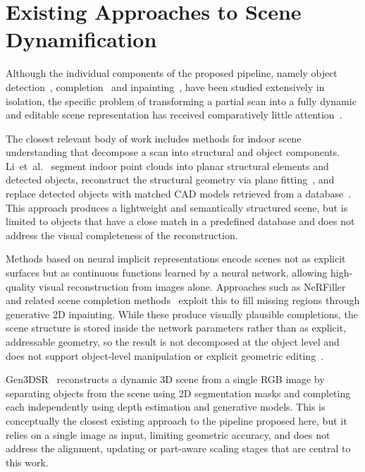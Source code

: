 \section{Existing Approaches to Scene Dynamification}
\label{sec:bg_sota_dynamification}

Although the individual components of the proposed pipeline, namely object detection~\cite{qi_deep_2019, xu_back_2022, cheng_aic3dod_nodate}, completion~\cite{mittal_autosdf_2022, chibane_implicit_2020, ren_xcube_2023, team_sam_2025} and inpainting~\cite{suvorov_resolution-robust_2022, vermandere_semantic_2024}, have been studied extensively in isolation, the specific problem of transforming a partial scan into a fully dynamic and editable scene representation has received comparatively little attention~\cite{ardelean_gen3dsr_2025}.

The closest relevant body of work includes methods for indoor scene understanding that decompose a scan into structural and object components. Li~et~al.~\cite{li_hybrid_2024} segment indoor point clouds into planar structural elements and detected objects, reconstruct the structural geometry via plane fitting~\cite{korman_latent_2018}, and replace detected objects with matched CAD models retrieved from a database~\cite{siddiqui_retrievalfuse_2021}. This approach produces a lightweight and semantically structured scene, but is limited to objects that have a close match in a predefined database and does not address the visual completeness of the reconstruction.

Methods based on neural implicit representations encode scenes not as explicit surfaces but as continuous functions learned by a neural network, allowing high-quality visual reconstruction from images alone. Approaches such as NeRFiller~\cite{weber_nerfiller_2023} and related scene completion methods~\cite{dai_spsg_2020, chen_circle_2021} exploit this to fill missing regions through generative 2D inpainting. While these produce visually plausible completions, the scene structure is stored inside the network parameters rather than as explicit, addressable geometry, so the result is not decomposed at the object level and does not support object-level manipulation or explicit geometric editing~\cite{roldao_3d_2022}.

Gen3DSR~\cite{ardelean_gen3dsr_2025} reconstructs a dynamic 3D scene from a single RGB image by separating objects from the scene using 2D segmentation masks and completing each independently using depth estimation and generative models. This is conceptually the closest existing approach to the pipeline proposed here, but it relies on a single image as input, limiting geometric accuracy, and does not address the alignment, updating or part-aware scaling stages that are central to this work.

